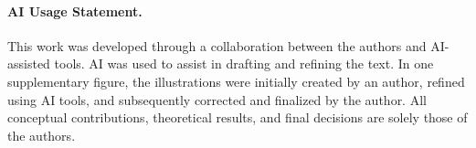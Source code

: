 \documentclass[acmtog,anonymous,review]{acmart}
\begin{document}


\paragraph{AI Usage Statement.}
This work was developed through a collaboration between the authors and AI-assisted tools. AI was used to assist in drafting and refining the text. In one supplementary figure, the illustrations were initially created by an author, refined using AI tools, and subsequently corrected and finalized by the author. All conceptual contributions, theoretical results, and final decisions are solely those of the authors.



\end{document}
